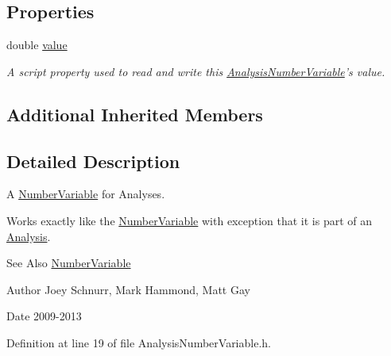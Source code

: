 \subsection*{Properties}
\begin{DoxyCompactItemize}
\item 
\hypertarget{class_picto_1_1_analysis_number_variable_aeb9a2ab4b3632becc3187b853b22ba31}{double \hyperlink{class_picto_1_1_analysis_number_variable_aeb9a2ab4b3632becc3187b853b22ba31}{value}}\label{class_picto_1_1_analysis_number_variable_aeb9a2ab4b3632becc3187b853b22ba31}

\begin{DoxyCompactList}\small\item\em A script property used to read and write this \hyperlink{class_picto_1_1_analysis_number_variable}{Analysis\-Number\-Variable}'s value. \end{DoxyCompactList}\end{DoxyCompactItemize}
\subsection*{Additional Inherited Members}


\subsection{Detailed Description}
A \hyperlink{class_picto_1_1_number_variable}{Number\-Variable} for Analyses. 

Works exactly like the \hyperlink{class_picto_1_1_number_variable}{Number\-Variable} with exception that it is part of an \hyperlink{class_picto_1_1_analysis}{Analysis}. \begin{DoxySeeAlso}{See Also}
\hyperlink{class_picto_1_1_number_variable}{Number\-Variable} 
\end{DoxySeeAlso}
\begin{DoxyAuthor}{Author}
Joey Schnurr, Mark Hammond, Matt Gay 
\end{DoxyAuthor}
\begin{DoxyDate}{Date}
2009-\/2013 
\end{DoxyDate}


Definition at line 19 of file Analysis\-Number\-Variable.\-h.



